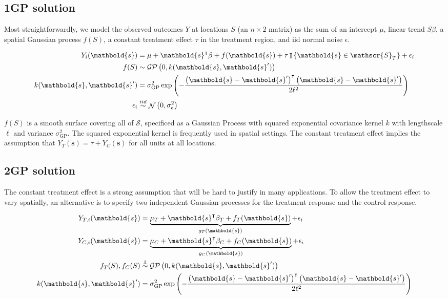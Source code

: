 \documentclass[letter]{article}
\newcommand{\genericdel}[3]{%
      \left#1#3\right#2
    }
\newcommand{\del}[1]{\genericdel(){#1}}
\newcommand{\cbr}[1]{\genericdel\{\}{#1}}
\DeclareMathOperator{\Ind}{\mathbb{I}}
\DeclareMathOperator{\normal}{\mathcal{N}}
\newcommand{\gp}{\mathcal{GP}}
\newcommand{\trans}{^{\intercal}}
\newcommand{\scrS}{\mathscr{S}}
\newcommand{\sigmaf}{\sigma_{\mathrm{GP}}}
\newcommand{\svec}{\mathbold{s}}
\newcommand{\indep}{\protect\mathpalette{\protect\independenT}{\perp}}
\def\independenT#1#2{\mathrel{\rlap{$#1#2$}\mkern2mu{#1#2}}}
\newcommand{\iid}{iid}
\begin{document}
\subsection{1GP solution}\label{gp-solution}

Most straightforwardly, we model the observed outcomes \(Y\) at
locations \(S\) (an \(n \times 2\) matrix) as the sum of an intercept
\(\mu\), linear trend \(S\beta\), a spatial Gaussian process \(f(S)\), a
constant treatment effect \(\tau\) in the treatment region, and iid
normal noise \(\epsilon\).

\begin{equation}\begin{split}
Y_i(\svec) &= \mu+\svec\trans\beta + f(\svec) + \tau \Ind\cbr{\svec \in \scrS_T} + \epsilon_i \\
f(S) &\sim \gp\del{0, k(\svec, \svec')} \\
k(\svec,\svec') &= \sigmaf^2 \exp\del{ - \frac{\del{\svec-\svec'}\trans\del{\svec-\svec'}}{2 \ell^2}} \\
\epsilon_i &\overset{\iid}{\sim} \normal\del{0,\sigma_\epsilon^2}
\end{split}\end{equation}

\(f(S)\) is a smooth surface covering all of \(\scrS\), specificed as a
Gaussian Process with squared exponential covariance kernel \(k\) with
lengthscale \(\ell\) and variance \(\sigmaf^2\). The squared exponential
kernel is frequently used in spatial settings. The constant treatment
effect implies the assumption that \(Y_T(\svec) = \tau + Y_C(\svec)\)
for all units at all locations.
    


    	\subsection{2GP solution}\label{gp-solution}

The constant treatment effect is a strong assumption that will be hard
to justify in many applications. To allow the treatment effect to vary
spatially, an alternative is to specify two independent Gaussian
processes for the treatment response and the control response.

\begin{equation}
\begin{split}
Y_{T,i}(\svec) &= \underbrace{\mu_T + \svec\trans\beta_T + f_T(\svec)}_{g_T(\svec)} + \epsilon_i \\
Y_{C,i}(\svec) &= \underbrace{\mu_C + \svec\trans\beta_C + f_C(\svec)}_{g_C(\svec)} + \epsilon_i \\
f_T(S), f_C(S) &\overset{\indep}{\sim} \gp\del{0, k(\svec, \svec')} \\
k(\svec,\svec') &= \sigmaf^2 \exp\del{ - \frac{\del{\svec-\svec'}\trans\del{\svec-\svec'}}{2 \ell^2}}
\end{split}
\label{eq:spec2gp}
\end{equation}
\end{document}
